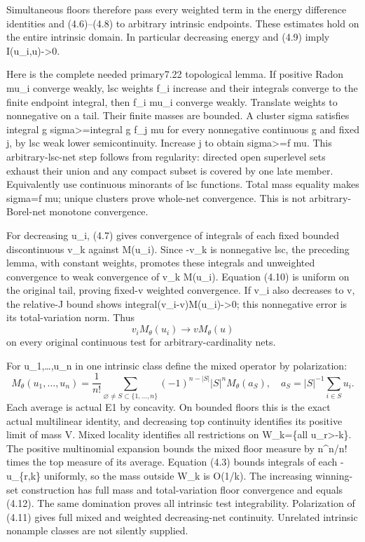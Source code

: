 \documentclass[
  10pt,
]{article}
\begin{document}
Simultaneous floors therefore pass every weighted term in the energy
difference identities and (4.6)--(4.8) to arbitrary intrinsic endpoints.
These estimates hold on the entire intrinsic domain. In particular
decreasing energy and (4.9) imply I(u\_i,u)-\textgreater0.

Here is the complete needed primary7.22 topological lemma. If positive
Radon mu\_i converge weakly, lsc weights f\_i increase and their
integrals converge to the finite endpoint integral, then f\_i mu\_i
converge weakly. Translate weights to nonnegative on a tail. Their
finite masses are bounded. A cluster sigma satisfies integral g
sigma\textgreater=integral g f\_j mu for every nonnegative continuous g
and fixed j, by lsc weak lower semicontinuity. Increase j to obtain
sigma\textgreater=f mu. This arbitrary-lsc-net step follows from
regularity: directed open superlevel sets exhaust their union and any
compact subset is covered by one late member. Equivalently use
continuous minorants of lsc functions. Total mass equality makes sigma=f
mu; unique clusters prove whole-net convergence. This is not
arbitrary-Borel-net monotone convergence.

For decreasing u\_i, (4.7) gives convergence of integrals of each fixed
bounded discontinuous v\_k against M(u\_i). Since -v\_k is nonnegative
lsc, the preceding lemma, with constant weights, promotes these
integrals and unweighted convergence to weak convergence of v\_k
M(u\_i). Equation (4.10) is uniform on the original tail, proving
fixed-v weighted convergence. If v\_i also decreases to v, the
relative-J bound shows integral(v\_i-v)M(u\_i)-\textgreater0; this
nonnegative error is its total-variation norm. Thus \[
 v_i M_\theta(u_i)\longrightarrow vM_\theta(u)                           \tag{4.11}
\] on every original continuous test for arbitrary-cardinality nets.

For u\_1,\ldots,u\_n in one intrinsic class define the mixed operator by
polarization: \[
 M_\theta(u_1,\ldots,u_n)=\frac1{n!}
 \sum_{\varnothing\ne S\subset\{1,\ldots,n\}}(-1)^{n-|S|}|S|^nM_\theta(a_S),
 \quad a_S=|S|^{-1}\sum_{i\in S}u_i.                                   \tag{4.12}
\] Each average is actual E1 by concavity. On bounded floors this is the
exact actual multilinear identity, and decreasing top continuity
identifies its positive limit of mass V. Mixed locality identifies all
restrictions on W\_k=\{all u\_r\textgreater-k\}. The positive
multinomial expansion bounds the mixed floor measure by n\^{}n/n! times
the top measure of its average. Equation (4.3) bounds integrals of each
-u\_\{r,k\} uniformly, so the mass outside W\_k is O(1/k). The
increasing winning-set construction has full mass and total-variation
floor convergence and equals (4.12). The same domination proves all
intrinsic test integrability. Polarization of (4.11) gives full mixed
and weighted decreasing-net continuity. Unrelated intrinsic nonample
classes are not silently supplied.
\end{document}
